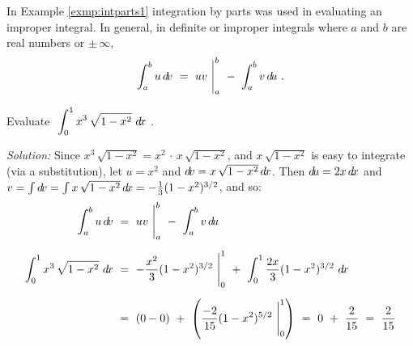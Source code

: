 \divider
\newpage
In Example \ref{exmp:intparts1} integration by parts was used in evaluating an
improper integral. In general, in definite or improper integrals where $a$ and
$b$ are real numbers or $\pm\,\infty$,
\[
\int_a^b u\,d\!v ~=~ uv~\Biggr|_a^b ~-~ \int_a^b v\,d\!u ~.
\]
\begin{exmp}\label{exmp:intparts9}
\noindent Evaluate $~\displaystyle\int_0^1 x^3\,\sqrt{1-x^2}~d\!x~$.\vspace{1mm}
\par\noindent\emph{Solution:} Since
$x^3\,\sqrt{1-x^2} =x^2\,\cdot\,x\,\sqrt{1-x^2}$, and $x\,\sqrt{1-x^2}$
is easy to integrate (via a substitution), let  $u=x^2$ and
$d\!v=x\,\sqrt{1-x^2}\,d\!x$. Then $d\!u = 2x\,d\!x$ and
$v = \int d\!v = \int x\,\sqrt{1-x^2}\,d\!x = -\frac{1}{3}(1-x^2)^{3/2}$, and so:
\begin{align*}
\int_a^b u\,d\!v ~&=~ uv~\Biggr|_a^b ~-~ \int_a^b v\,d\!u\\[6pt]
\int_0^1 x^3\,\sqrt{1-x^2}~d\!x ~&=~ -\frac{x^2}{3}(1-x^2)^{3/2}~\Biggr|_0^1 ~+~
 \int_0^1 \frac{2x}{3}(1-x^2)^{3/2}~d\!x\\[6pt]
&=~ (0 - 0) ~+~ \left(\frac{-2}{15}(1-x^2)^{5/2}~\Biggr|_0^1\right) ~=~ 0 ~+~
 \frac{2}{15} ~=~ \frac{2}{15}
\end{align*}
\end{exmp}
\divider
\vspace{3mm}
\startexercises\label{sec6dot1}
